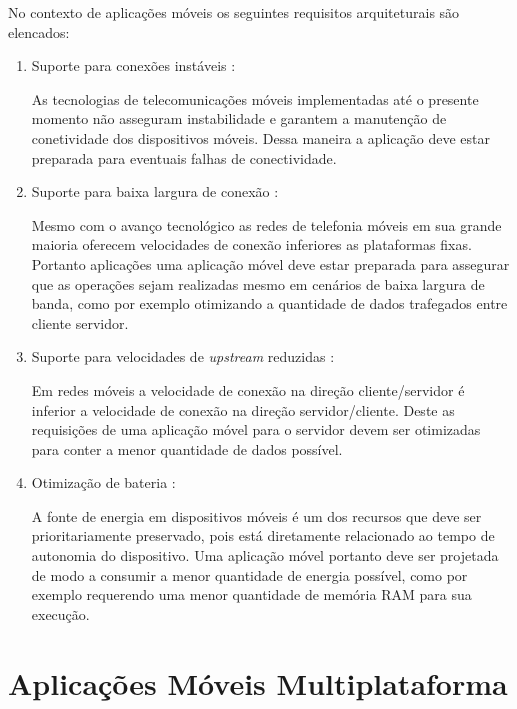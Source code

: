 \documentclass[
	article,			%
	11pt,				%
	oneside,			%
	a4paper,			%
	english,			%
	brazil,				%
	sumario=tradicional
]{abntex2}
\begin{document}
No contexto de aplicações móveis os seguintes requisitos arquiteturais são elencados:
\begin{enumerate}
	\item Suporte para conexões instáveis \cite{rathore2007overview}:
	
	As tecnologias de telecomunicações móveis implementadas até o presente momento não asseguram instabilidade e garantem a manutenção de conetividade dos dispositivos móveis. Dessa maneira a aplicação deve estar preparada para eventuais falhas de conectividade.
	
	\item Suporte para baixa largura de conexão \cite{rathore2007overview}:
	
	Mesmo com o avanço tecnológico as redes de telefonia móveis em sua grande maioria oferecem velocidades de conexão inferiores as plataformas fixas. Portanto aplicações uma aplicação móvel deve estar preparada para assegurar que as operações sejam realizadas mesmo em cenários de baixa largura de banda, como por exemplo otimizando a quantidade de dados trafegados entre cliente servidor.
	
	\item Suporte para velocidades de \emph{upstream} reduzidas \cite{rathore2007overview}:
	
	Em redes móveis a velocidade de conexão na direção cliente/servidor é inferior a velocidade de conexão na direção servidor/cliente. Deste as requisições de uma aplicação móvel para o servidor devem ser otimizadas para conter a menor quantidade de dados possível.
	
	\item Otimização de bateria \cite{rathore2007overview}:
	
	A fonte de energia em dispositivos móveis é um dos recursos que deve ser prioritariamente preservado, pois está diretamente relacionado ao tempo de autonomia do dispositivo. Uma aplicação móvel portanto deve ser projetada de modo a consumir a menor quantidade de energia possível, como por exemplo requerendo uma menor quantidade de memória RAM para sua execução.
	
	
	
\end{enumerate}

\section{Aplicações Móveis Multiplataforma}
\end{document}

